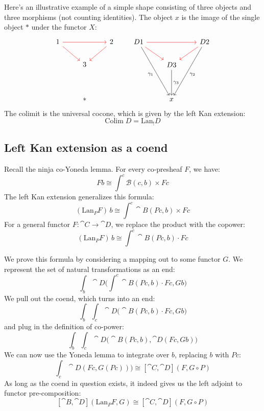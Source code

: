 \documentclass[DaoFP]{subfiles}
\begin{document}
Here's an illustrative example of a simple shape consisting of three objects and three morphisms (not counting identities). The object $x$ is the image of the single object $*$ under the functor $X$:
\[
 \begin{tikzcd}
1 
\arrow[rr, red]
\arrow[rd, red]
&& 2
\arrow[dl, red]
\\
& 3
\\
\\
& *
 \end{tikzcd}
 \qquad
 \begin{tikzcd}
D 1 
\arrow[rr, red]
\arrow[rd, red]
\arrow[dddr, "\gamma_1"']
&& D 2
\arrow[dl, red]
\arrow[dddl, "\gamma_2"]
\\
& D 3
\arrow[dd, "\gamma_3"]
\\
\\
&x
 \end{tikzcd}
 \]
The colimit is the universal cocone, which is given by the left Kan extension:
\[ \text{Colim}\; D = \text{Lan}_! D \]



\subsection{Left Kan extension as a coend}

Recall the ninja co-Yoneda lemma. For every co-presheaf $F$, we have:
\[ F b \cong \int^{c} \mathcal{B}(c, b) \times F c \]
The left Kan extension generalizes this formula:
\[ (\text{Lan}_P F)\, b \cong \int^{c} \cat B (P c, b) \times F c \]
For a general functor $F \colon \cat C \to \cat D$, we replace the product with the copower:
\[ (\text{Lan}_P F)\, b \cong \int^{c} \cat B(P c, b) \cdot F c \]

We prove this formula by considering a mapping out to some functor $G$. We represent the set of natural transformations as an end:
\[\int_b \cat D \big(\int^c \cat B(P c, b) \cdot F c, G b\big) \]
We pull out the coend, which turns into an end:
\[\int_b \int_c \cat D \big(\cat B(P c, b) \cdot F c, G b\big) \]
and plug in the definition of co-power:
\[\int_b \int_c \cat D \big(\cat B(P c, b), \cat D (F c, G b)\big) \]
We can now use the Yoneda lemma to integrate over $b$, replacing $b$ with $P c$:
\[\int_c \cat D (F c, G (P c))\big) \cong  [\cat C, \cat D] (F, G \circ P) \]
As long as the coend in question exists, it indeed gives us the left adjoint to functor pre-composition:
\[ [\cat B, \cat D](\text{Lan}_P F , G) \cong  [\cat C, \cat D] (F, G \circ P) \]
\end{document}

